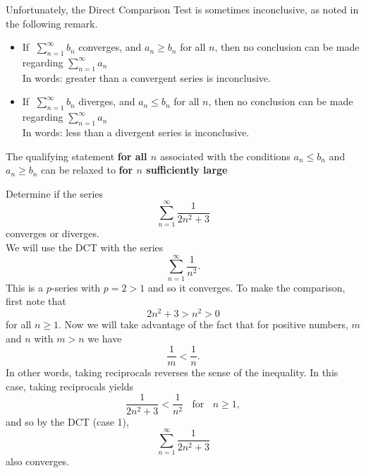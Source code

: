 \documentclass[handout]{ximera}
\begin{document}
Unfortunately, the Direct Comparison Test is sometimes inconclusive, as noted in the following remark.
\begin{remark}
\begin{itemize}
\item
If $\; \displaystyle{\sum_{n=1}^\infty b_n}$ converges, and $a_n \geq b_n$ for all $n$,  
then no conclusion can be made regarding $\displaystyle{\sum_{n=1}^\infty a_n}$ \\
In words: greater than a convergent series is inconclusive.\\
\item
If $\; \displaystyle{\sum_{n=1}^\infty b_n}$ diverges, and $a_n \leq b_n$ for all $n$,  
then no conclusion can be made regarding $\displaystyle{\sum_{n=1}^\infty a_n}$\\
In words: less than a divergent series is inconclusive.\\
\end{itemize}
\end{remark}

\begin{remark}
The qualifying statement \textbf{for all $n$} associated with the
 conditions $a_n \leq b_n$ and $ a_n \geq b_n$ can be relaxed to
  \textbf{for $n$ sufficiently large}
\end{remark}



\begin{example}[example 1] %
Determine if the series 
\[
\sum_{n=1}^\infty \frac{1}{2n^2 + 3}
\]
converges or diverges.\\
We will use the DCT with the series 
\[
\sum_{n=1}^\infty \frac{1}{n^2}.
\] 
This is a $p$-series with $p=2 >1$ and so it converges.
To make the comparison, first note that 
\[
2n^2 + 3 > n^2 > 0
\]
 for all $n \geq 1$. Now we will take advantage of the fact that for positive numbers, $m$ and $n$ with $m>n$ we have 
 \[
 \frac{1}{m} < \frac{1}{n}.
 \]
 In other words, taking reciprocals reverses the sense of the inequality. In this case, taking reciprocals yields 
\[
\frac{1}{2n^2 + 3} < \frac{1}{n^2} \; \; \text{ for } \; \; n \geq 1,
\]
and so by the DCT (case 1), 
\[
\sum_{n=1}^\infty \frac{1}{2n^2 + 3}
\]
 also converges.
\end{example}
\end{document}
